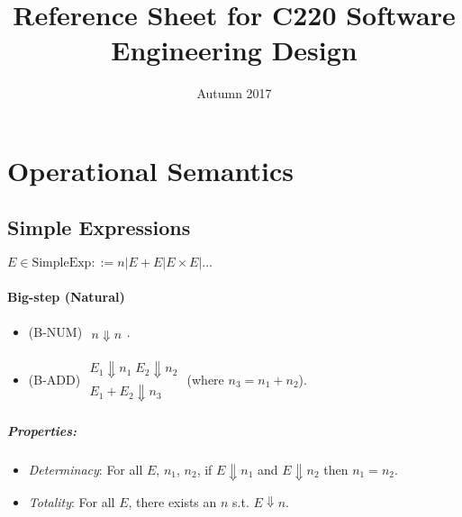 \documentclass[twocolumn,english]{article}
\begin{document}
\title{Reference Sheet for C220 Software Engineering Design}

\date{Autumn 2017}
\maketitle

\section{Operational Semantics}

\subsection{Simple Expressions}

$E\in\text{SimpleExp}::=n\lvert E+E\lvert E\times E\lvert\dots$

\paragraph{Big-step (Natural)}
\begin{itemize}
\item {\scriptsize{}(B-NUM)} $\begin{array}{c}
\\
\hline n\Downarrow n
\end{array}$.
\item {\scriptsize{}(B-ADD)} $\begin{array}{c}
E_{1}\Downarrow n_{1}\;E_{2}\Downarrow n_{2}\\
\hline E_{1}+E_{2}\Downarrow n_{3}
\end{array}$ (where $n_{3}=n_{1}+n_{2}$).
\end{itemize}

\subparagraph{Properties:}
\begin{itemize}
\item \emph{Determinacy}: For all $E$, $n_{1}$, $n_{2}$, if $E\Downarrow n_{1}$
and $E\Downarrow n_{2}$ then $n_{1}=n_{2}$.
\item \emph{Totality}: For all $E$, there exists an $n$ s.t. $E\Downarrow n$.
\end{itemize}
\end{document}
